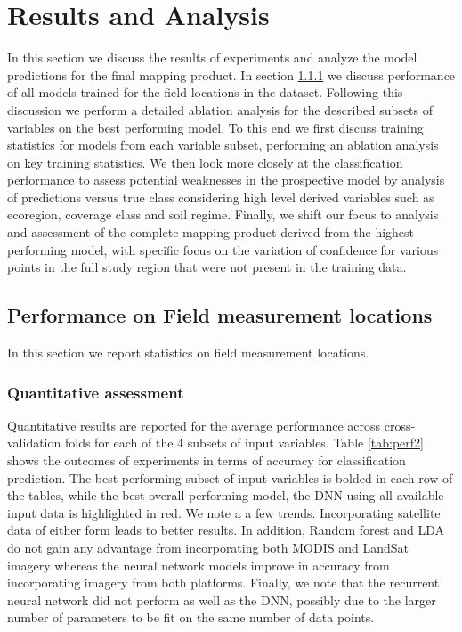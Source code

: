 \def\year{2017}\relax \documentclass[letterpaper]{article}
\begin{document}
\section{Results and Analysis}
In this section we discuss the results of experiments and analyze the model predictions for the final mapping product. In section \ref{sec:res1} we discuss performance of all models trained for the field locations in the dataset. Following this discussion we perform a detailed ablation analysis for the described subsets of variables on the best performing model. To this end we first discuss training statistics for models from each variable subset, performing an ablation analysis on key training statistics. We then look more closely at the classification performance to assess potential weaknesses in the prospective model by analysis of predictions versus true class considering high level derived variables such as ecoregion, coverage class and soil regime. Finally, we shift our focus to analysis and assessment of the complete mapping product derived from the highest performing model, with specific focus on the variation of confidence for various points in the full study region that were not present in the training data. 
\subsection{Performance on Field measurement locations}
In this section we report statistics on field measurement locations.
\subsubsection{Quantitative assessment} \label{sec:res1}
Quantitative results are reported for the average performance across cross-validation folds for each of the 4 subsets of input variables. Table \ref{tab:perf2} shows the outcomes of experiments in terms of accuracy for classification prediction. 
The best performing subset of input variables is bolded in each row of the tables, while the best overall performing model, the DNN using all available input data is highlighted in red. We note a a few trends. Incorporating satellite data of either form leads to better results. In addition, Random forest and LDA do not gain any advantage from incorporating both MODIS and LandSat imagery whereas the neural network models improve in accuracy from incorporating imagery from both platforms. Finally, we note that the recurrent neural network did not perform as well as the DNN, possibly due to the larger number of parameters to be fit on the same number of data points.
\end{document}
